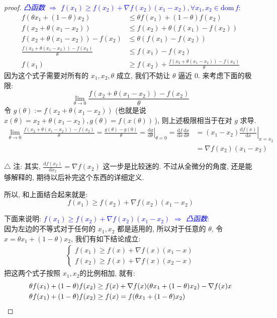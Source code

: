 \documentclass{article}
\begin{document}
\begin{proof}[proof]
  \textcolor{blue}{\emph{凸函数 $\Rightarrow$ $f(x_1) \geq f(x_2) + \nabla f(x_2)(x_1 - x_2), \forall x_1, x_2 \in\mathrm{dom}\,f$}:}\\
  \begin{align*}
    f(\theta x_1 + (1 - \theta)x_2) &\leq \theta f(x_1) + (1 - \theta)f(x_2) \\
    f(x_2 + \theta(x_1 - x_2)) &\leq f(x_2) + \theta(f(x_1) - f(x_2)) \\
    f(x_2 + \theta(x_1 - x_2)) - f(x_2) &\leq  \theta(f(x_1) - f(x_2)) \\
    \frac{f(x_2 + \theta(x_1 - x_2)) - f(x_2)}{\theta} &\leq f(x_1) - f(x_2) \\
    f(x_1) &\geq f(x_2) + \frac{f(x_2 + \theta(x_1 - x_2)) - f(x_2)}{\theta} 
  \end{align*}
  因为这个式子需要对所有的 $x_1, x_2, \theta$ 成立, 我们不妨让 $\theta$ 逼近 $0$.
  来考虑下面的极限:
  \[\lim_{\theta\to 0}\frac{f(x_2 + \theta(x_1 - x_2)) - f(x_2)}{\theta}\]
  令 $g(\theta) := f(x_2 + \theta(x_1 - x_2))$ (也就是说 $x(\theta) = x_2 + \theta(x_1 - x_2), g(\theta) = f(x(\theta))\,$), 则上述极限相当于在对 $g$ 求导.
  \begin{align*}
    \lim_{\theta\to 0}\frac{f(x_2 + \theta(x_1 - x_2)) - f(x_2)}{\theta} = \frac{g(\theta) - g(0)}{\theta} = \left.\frac{\mathrm{d}g}{\mathrm{d}\theta}\right|_{\theta = 0}
                                                                         = \frac{\mathrm{d}f}{\mathrm{d}x}\frac{\mathrm{d}x}{\mathrm{d}\theta} 
    &= \left.(x_1 - x_2) \frac{\mathrm{d}f(x)}{\mathrm{d}x}\right|_{x=x_2} \\
    &= \nabla f(x_2)(x_1 - x_2)
  \end{align*}

  $\triangle$ 注: 其实, $\frac{\mathrm{d}f(x_2)}{\mathrm{d}x_2} = \nabla f(x_2)$ 这一步是比较迷的. 不过从全微分的角度, 还是能够解释的, 期待以后补完这个东西的详细定义.
  
  所以, 和上面结合起来就是:
  \[f(x_1) \geq f(x_2) + \nabla f(x_2)(x_1 - x_2)\]

  下面来说明:
  \textcolor{blue}{\emph{$f(x_1) \geq f(x_2) + \nabla f(x_2)(x_1 - x_2)$ $\Rightarrow$ 凸函数}:}\\
  因为左边的不等式对于任何的 $x_1, x_2$ 都是适用的, 所以对于任意的 $\theta$, 令  $x = \theta x_1 + (1 - \theta) x_2$, 我们有如下结论成立:
  \begin{align*}
    \left\{
    \begin{array}{l}
      f(x_1) \geq f(x) + \nabla f(x) (x_1 - x) \\
      f(x_2) \geq f(x) + \nabla f(x) (x_2 - x)
    \end{array}
    \right.
  \end{align*}
  把这两个式子按照 $x_1, x_2$的比例相加, 就有:
  \begin{align*}
    \theta f(x_1) + (1 - \theta)f(x_2) &\geq f(x) + \nabla f(x) (\theta x_1 + (1 - \theta) x_2)  - \nabla f(x) x \\
    \theta f(x_1) + (1 - \theta)f(x_2) &\geq f(x) = f(\theta x_1 + (1-\theta)x_2) \qedhere
  \end{align*}
\end{proof}
\end{document}
